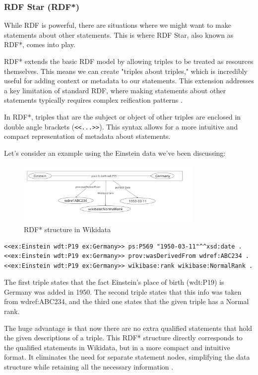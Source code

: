 \subsubsection{RDF Star (RDF*)}

While RDF is powerful, there are situations where we might want to make statements about other statements. This is where RDF Star, also known as RDF*, comes into play.

RDF* extends the basic RDF model by allowing triples to be treated as resources themselves. This means we can create "triples about triples," which is incredibly useful for adding context or metadata to our statements. This extension addresses a key limitation of standard RDF, where making statements about other statements typically requires complex reification patterns \citep{hartig2017foundations}. 

In RDF*, triples that are the subject or object of other triples are enclosed in double angle brackets (\verb|<<...>>|). This syntax allows for a more intuitive and compact representation of metadata about statements.

Let's consider an example using the Einstein data we've been discussing:

\begin{figure}[htbp]
    \centering
    \includegraphics[width=0.8\textwidth]{8.png}
    \caption{RDF* structure in Wikidata}
    \label{fig:image8}
\end{figure}

{\footnotesize
\begin{verbatim}
<<ex:Einstein wdt:P19 ex:Germany>> ps:P569 "1950-03-11"^^xsd:date .
<<ex:Einstein wdt:P19 ex:Germany>> prov:wasDerivedFrom wdref:ABC234 .
<<ex:Einstein wdt:P19 ex:Germany>> wikibase:rank wikibase:NormalRank .
\end{verbatim}
}

The first triple states that the fact Einstein's place of birth (wdt:P19) is Germany was added in 1950. The second triple states that this info was taken from wdref:ABC234, and the third one states that the given triple has a Normal rank.

The huge advantage is that now there are no extra qualified statements that hold the given descriptions of a triple. This RDF* structure directly corresponds to the qualified statements in Wikidata, but in a more compact and intuitive format. It eliminates the need for separate statement nodes, simplifying the data structure while retaining all the necessary information \citep{hartig2017foundations}.

